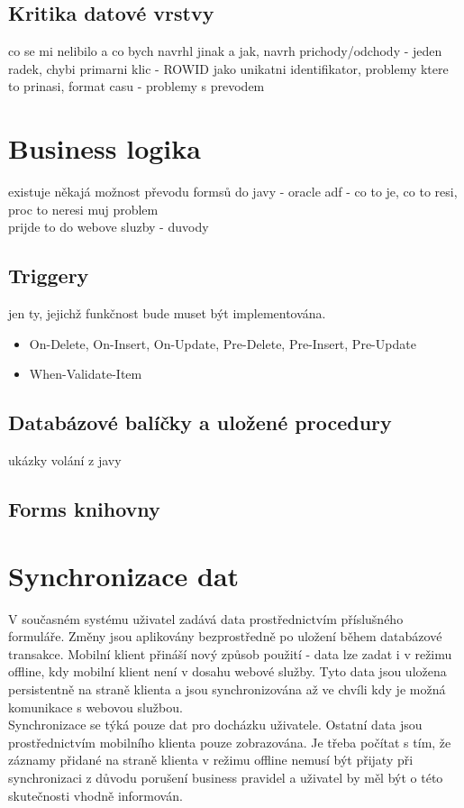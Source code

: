 \documentclass{diplomka}
\begin{document}
\subsection{Kritika datové vrstvy}
co se mi nelibilo a co bych navrhl jinak a jak, navrh prichody/odchody - jeden radek,
chybi primarni klic - ROWID jako unikatni identifikator, problemy ktere to prinasi,
format casu - problemy s prevodem

\section{Business logika}
existuje někajá možnost převodu formsů do javy - oracle adf - co to je, co to resi, proc to neresi muj problem\\
prijde to do webove sluzby - duvody
\subsection{Triggery}
jen ty, jejichž funkčnost bude muset být implementována.
\begin{itemize}
\item On-Delete, On-Insert, On-Update, Pre-Delete, Pre-Insert, Pre-Update
\item When-Validate-Item
\end{itemize}

\subsection{Databázové balíčky a uložené procedury}
ukázky volání z javy
\subsection{Forms knihovny}

\section{Synchronizace dat}
V současném systému uživatel zadává data prostřednictvím příslušného formuláře. Změny jsou aplikovány bezprostředně po uložení během databázové transakce. Mobilní klient přináší nový způsob použití - data lze zadat i v režimu offline, kdy mobilní klient není v dosahu webové služby. Tyto data jsou uložena persistentně na straně klienta a jsou synchronizována až ve chvíli kdy je možná komunikace s webovou službou.\\ \indent
Synchronizace se týká pouze dat pro docházku uživatele. Ostatní data jsou prostřednictvím mobilního klienta pouze zobrazována. Je třeba počítat s tím, že záznamy přidané na straně klienta v režimu offline nemusí být přijaty při synchronizaci z důvodu porušení business pravidel a uživatel by měl být o této skutečnosti vhodně informován.
\end{document}
